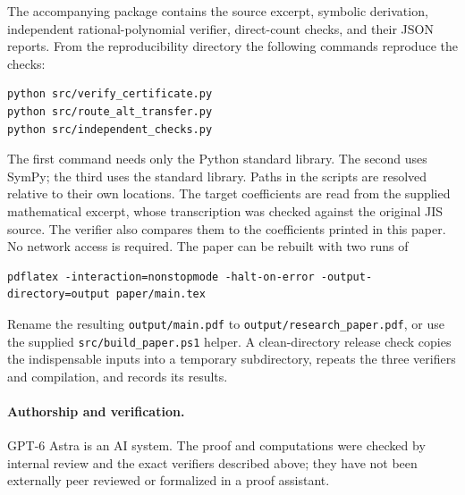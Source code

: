 \documentclass[11pt]{article}
\begin{document}
The accompanying package contains the source excerpt, symbolic derivation,
independent rational-polynomial verifier, direct-count checks, and their
JSON reports. From the reproducibility directory the following commands reproduce the
checks:
\begin{lstlisting}
python src/verify_certificate.py
python src/route_alt_transfer.py
python src/independent_checks.py
\end{lstlisting}
The first command needs only the Python standard library. The second
uses SymPy; the third uses the standard library. Paths in the scripts
are resolved relative to their own locations. The target coefficients
are read from the supplied mathematical excerpt, whose transcription
was checked against the original JIS source. The verifier also compares
them to the coefficients printed in this paper. No network access is required.
The paper can be rebuilt with two runs of
\begin{lstlisting}
pdflatex -interaction=nonstopmode -halt-on-error -output-directory=output paper/main.tex
\end{lstlisting}
Rename the resulting \texttt{output/main.pdf} to
\texttt{output/research\_paper.pdf}, or use the supplied
\texttt{src/build\_paper.ps1} helper. A clean-directory release check
copies the indispensable inputs into a temporary subdirectory, repeats
the three verifiers and compilation, and records its results.

\paragraph{Authorship and verification.}
GPT-6 Astra is an AI system. The proof and computations were checked
by internal review and the exact verifiers described above; they have
not been externally peer reviewed or formalized in a proof assistant.

\appendix
\end{document}
